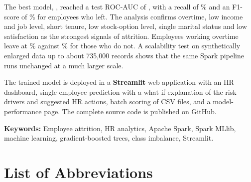\documentclass[12pt,a4paper]{report}
\begin{document}
The best model, \textbf{\BestModel}, reached a test ROC-AUC of \textbf{\BestTestAUC}, with a recall of \BestRecall\% and an F1-score of \BestFone\% for employees who left. The analysis confirms overtime, low income and job level, short tenure, low stock-option level, single marital status and low satisfaction as the strongest signals of attrition. Employees working overtime leave at \OTYes\% against \OTNo\% for those who do not. A scalability test on synthetically enlarged data up to about 735,000 records shows that the same Spark pipeline runs unchanged at a much larger scale.

The trained model is deployed in a \textbf{Streamlit} web application with an HR dashboard, single-employee prediction with a what-if explanation of the risk drivers and suggested HR actions, batch scoring of CSV files, and a model-performance page. The complete source code is published on GitHub.

\vspace{0.5cm}
\noindent\textbf{Keywords:} Employee attrition, HR analytics, Apache Spark, Spark MLlib, machine learning, gradient-boosted trees, class imbalance, Streamlit.


\clearpage
\tableofcontents
\clearpage
\listoffigures
\clearpage
\listoftables

\chapter*{List of Abbreviations}
\end{document}
